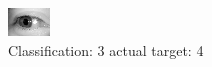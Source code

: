 \begin{figure}[h!]
\begin{center}
\includegraphics[width=0.60\columnwidth]{figures/ID3266_class_3_target_4.png}
\end{center}
\caption{ Classification: 3 actual target: 4}
\label{fig:ID3266_class_3_target_4}
\end{figure}
